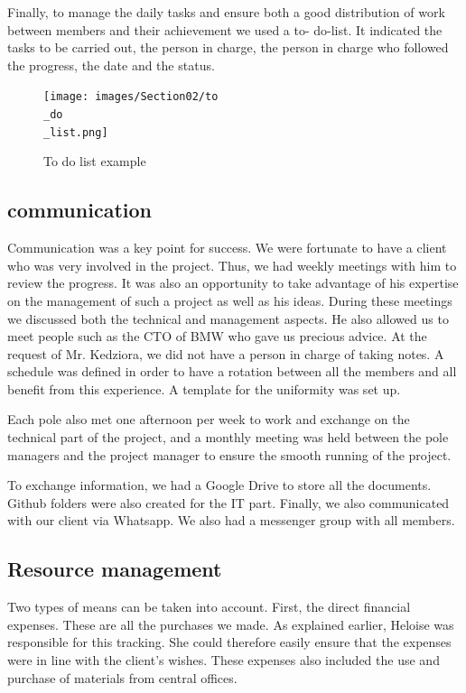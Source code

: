 \bigbreak
Finally, to manage the daily tasks and ensure both a good distribution of work between members and their achievement we used a to- do-list. It indicated the tasks to be carried out, the person in charge, the person in charge who followed the progress, the date and the status. 

\begin{figure}[ht]
    \centering
    \texttt{[image: images/Section02/to\\\_do\\\_list.png]}
    \caption{To do list example}
    \label{fig:mesh6}
\end{figure}

\subsection{communication}

Communication was a key point for success. We were fortunate to have a client who was very involved in the project. Thus, we had weekly meetings with him to review the progress. It was also an opportunity to take advantage of his expertise on the management of such a project as well as his ideas. During these meetings we discussed both the technical and management aspects. He also allowed us to meet people such as the CTO of BMW who gave us precious advice. At the request of Mr. Kedziora, we did not have a person in charge of taking notes. A schedule was defined in order to have a rotation between all the members and all benefit from this experience. A template for the uniformity was set up. 

\bigbreak
Each pole also met one afternoon per week to work and exchange on the technical part of the project, and a monthly meeting was held between the pole managers and the project manager to ensure the smooth running of the project. 

\bigbreak
To exchange information, we had a Google Drive to store all the documents. Github folders were also created for the IT part. Finally, we also communicated with our client via Whatsapp. We also had a messenger group with all members. 

\subsection{Resource management}

Two types of means can be taken into account. First, the direct financial expenses. These are all the purchases we made. As explained earlier, Heloise was responsible for this tracking. She could therefore easily ensure that the expenses were in line with the client's wishes. These expenses also included the use and purchase of materials from central offices. 

